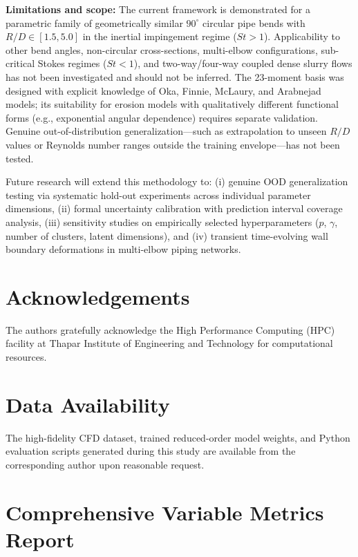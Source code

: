 \documentclass{article}
\begin{document}
\textbf{Limitations and scope:} The current framework is demonstrated for a parametric family of geometrically similar $90^\circ$ circular pipe bends with $R/D \in [1.5, 5.0]$ in the inertial impingement regime ($St > 1$). Applicability to other bend angles, non-circular cross-sections, multi-elbow configurations, sub-critical Stokes regimes ($St < 1$), and two-way/four-way coupled dense slurry flows has not been investigated and should not be inferred. The 23-moment basis was designed with explicit knowledge of Oka, Finnie, McLaury, and Arabnejad models; its suitability for erosion models with qualitatively different functional forms (e.g., exponential angular dependence) requires separate validation. Genuine out-of-distribution generalization---such as extrapolation to unseen $R/D$ values or Reynolds number ranges outside the training envelope---has not been tested.

Future research will extend this methodology to: (i) genuine OOD generalization testing via systematic hold-out experiments across individual parameter dimensions, (ii) formal uncertainty calibration with prediction interval coverage analysis, (iii) sensitivity studies on empirically selected hyperparameters ($p$, $\gamma$, number of clusters, latent dimensions), and (iv) transient time-evolving wall boundary deformations in multi-elbow piping networks.

\section*{Acknowledgements}
The authors gratefully acknowledge the High Performance Computing (HPC) facility at Thapar Institute of Engineering and Technology for computational resources.

\section*{Data Availability}
The high-fidelity CFD dataset, trained reduced-order model weights, and Python evaluation scripts generated during this study are available from the corresponding author upon reasonable request.




\appendix
\section{Comprehensive Variable Metrics Report}
\label{app:comprehensive_metrics}
\end{document}
